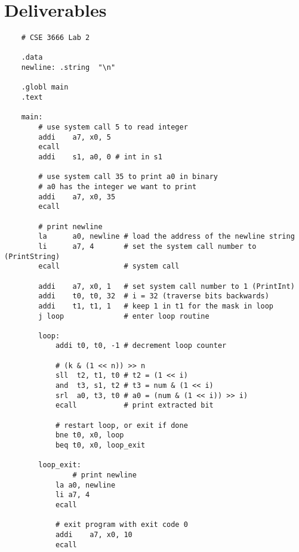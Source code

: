 \documentclass{article}
\begin{document}
\section{Deliverables}
    \begin{lstlisting}
    # CSE 3666 Lab 2

    .data
    newline: .string  "\n"
    
    .globl main
    .text
    
    main:          
        # use system call 5 to read integer
        addi    a7, x0, 5
        ecall
        addi    s1, a0, 0 # int in s1
    
        # use system call 35 to print a0 in binary
        # a0 has the integer we want to print
        addi    a7, x0, 35
        ecall
        
        # print newline
        la      a0, newline # load the address of the newline string
        li      a7, 4       # set the system call number to (PrintString)
        ecall               # system call
        
        addi    a7, x0, 1   # set system call number to 1 (PrintInt)
        addi    t0, t0, 32  # i = 32 (traverse bits backwards)
        addi    t1, t1, 1   # keep 1 in t1 for the mask in loop
        j loop              # enter loop routine
        
        loop:
            addi t0, t0, -1 # decrement loop counter
            
            # (k & (1 << n)) >> n
            sll  t2, t1, t0 # t2 = (1 << i)
            and  t3, s1, t2 # t3 = num & (1 << i)
            srl  a0, t3, t0 # a0 = (num & (1 << i)) >> i)
            ecall           # print extracted bit
            
            # restart loop, or exit if done
            bne t0, x0, loop
            beq t0, x0, loop_exit
            
        loop_exit:
                # print newline
            la a0, newline 
            li a7, 4
            ecall
    
            # exit program with exit code 0
            addi    a7, x0, 10      
            ecall
    \end{lstlisting}
    
\end{document}
